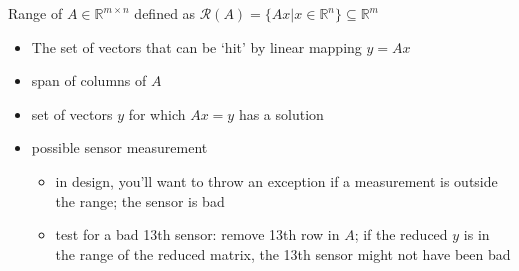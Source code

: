 \documentclass[10pt,letterpaper]{article}
\begin{document}
Range of $A \in \mathbb{R}^{m\times n}$ defined as $\mathcal{R}(A)=\{Ax | x \in \mathbb{R}^n\} \subseteq \mathbb{R}^m$ 
\begin{itemize}
\item The set of vectors that can be `hit' by linear mapping $y=Ax$
\item span of columns of $A$
\item set of vectors $y$ for which $Ax=y$ has a solution
\item possible sensor measurement

\begin{itemize}
\item in design, you'll want to throw an exception if a measurement is outside the range; the sensor is bad
\item test for a bad 13th sensor: remove 13th row in $A$; if the reduced $y$ is in the range of the reduced matrix, the 13th sensor might not have been bad
\end{itemize}

\end{itemize}
\end{document}
